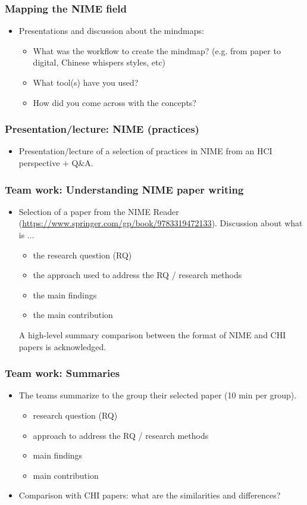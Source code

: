 \documentclass[screen, aspectratio=43]{beamer}
\begin{document}
%
\begin{frame}
\frametitle{Mapping the NIME field}
\begin{itemize}
\item Presentations and discussion about the mindmaps:
\begin{itemize}
\item What was the workflow to create the mindmap? (e.g. from paper to digital, Chinese whispers styles, etc)
\item What tool(s) have you used?
\item How did you come across with the concepts?
\end{itemize}
\end{itemize}
\end{frame}
%
\begin{frame}
\frametitle{Presentation/lecture: NIME (practices)}
\begin{itemize}
\item Presentation/lecture of a selection of practices in NIME from an HCI perspective + Q\&A.
\end{itemize}
\end{frame}
%
\begin{frame}
\frametitle{Team work: Understanding NIME paper writing}
\begin{itemize}
\item Selection of a paper from the NIME Reader (\url{https://www.springer.com/gp/book/9783319472133}). Discussion about what is ... 
\begin{itemize}
\item the research question (RQ)
\item the approach used to address the RQ / research methods
\item the main findings 
\item the main contribution
\end{itemize}
A high-level summary comparison between the format of NIME and CHI papers is acknowledged.
\end{itemize}
\end{frame}
%
\begin{frame}
\frametitle{Team work: Summaries}
\begin{itemize}
\item The teams summarize to the group their selected paper (10 min per group). 
\begin{itemize}
\item research question (RQ)
\item approach to address the RQ / research methods
\item main findings 
\item main contribution
\end{itemize}
\item Comparison with CHI papers: what are the similarities and differences? 
\end{itemize}
\end{frame}
\end{document}
